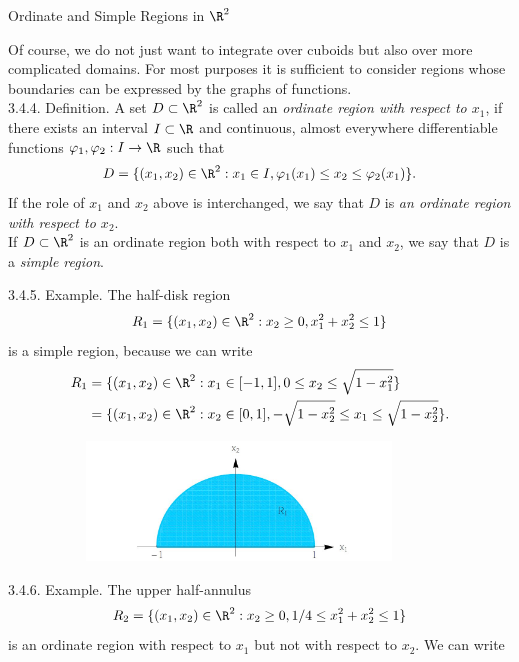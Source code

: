 \documentclass[smaller,hyperref={CJKbookmarks=true}]{beamer}
\begin{document}
\begin{frame}{Ordinate and Simple Regions in $\R^2$}
\begin{spacing}{1.05}
Of course, we do not just want to integrate over cuboids but also over
more complicated domains. For most purposes it is suf{}ficient to consider
regions whose boundaries can be expressed by the graphs of functions.\\[5pt]
\alert{3.4.4. Definition.} A set $D\subset\R^2$ is called an \emph{ordinate region with respect to $x_1$}, if there exists an interval $I\subset\R$ and continuous, almost everywhere dif{}ferentiable functions $\varphi_1,\varphi_2:I\to\R$ such that
\[D=\{(x_1,x_2)\in\R^2:x_1\in I,\varphi_1(x_1)\leq x_2\leq \varphi_2(x_1)\}.\]
If the role of $x_1$ and $x_2$ above is interchanged, we say that $D$ is \emph{an ordinate region with respect to $x_2$}.\\[5pt]
If $D\subset\R^2$ is an ordinate region both with respect to $x_1$ and $x_2$, we say that $D$ is a \emph{simple region}.
\end{spacing}
\newpage
\begin{spacing}{0.3}
\alert{3.4.5. Example.} The half-disk region
\[R_1=\{(x_1,x_2)\in\R^2:x_2\geq0,x_1^2+x_2^2\leq1\}\]
is a simple region, because we can write
\begin{equation*}
  \begin{split}
     R_1 &=\{(x_1,x_2)\in\R^2:x_1\in[-1,1],0\leq x_2\leq\sqrt{1-x_1^2}\} \\
       &=\{(x_1,x_2)\in\R^2:x_2\in[0,1],-\sqrt{1-x_2^2}
       \leq x_1\leq\sqrt{1-x_2^2}\}.
  \end{split}
\end{equation*}
\begin{figure}
  \centering
  \includegraphics[width=0.9\textwidth,height=90pt]{70.jpg}
\end{figure}
\end{spacing}
\newpage
\begin{spacing}{1}
\alert{3.4.6. Example.} The upper half-annulus
\[R_2=\{(x_1,x_2)\in\R^2:x_2\geq0,1/4\leq x_1^2+x_2^2\leq1\}\]
is an ordinate region with respect to $x_1$ but not with respect to $x_2$. We can write

\end{spacing}
\end{frame}
\end{document}
